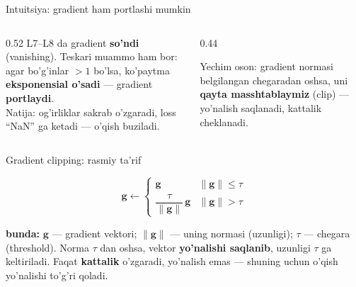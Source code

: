 \documentclass[aspectratio=169,11pt]{beamer}
\newcommand{\bunda}[1]{{\small\textbf{bunda:}\; #1}}
\begin{document}
\begin{frame}{Intuitsiya: gradient ham portlashi mumkin}
  \begin{columns}[T]
    \begin{column}{0.52\textwidth}
      \small
      L7--L8 da gradient \textbf{so'ndi} (vanishing). Teskari muammo ham bor:
      agar bo'g'inlar $>1$ bo'lsa, ko'paytma \textbf{eksponensial o'sadi} ---
      gradient \textbf{portlaydi}.\\[6pt]
      Natija: og'irliklar sakrab o'zgaradi, loss ``NaN'' ga ketadi --- o'qish buziladi.
    \end{column}
    \begin{column}{0.44\textwidth}
      \begin{tcolorbox}[okbox,top=2pt,bottom=2pt]
        \footnotesize
        Yechim oson: gradient normasi belgilangan chegaradan oshsa, uni
        \textbf{qayta masshtablaymiz} (clip) --- yo'nalish saqlanadi, kattalik
        cheklanadi.
      \end{tcolorbox}
    \end{column}
  \end{columns}
\end{frame}

\begin{frame}{Gradient clipping: rasmiy ta'rif}
  \begin{tcolorbox}[defbox,title=Ta'rif: norma bo'yicha gradient clipping]
    \vspace{-0.4em}
    $$ \mathbf{g} \leftarrow
       \begin{cases}
         \mathbf{g} & \|\mathbf{g}\| \le \tau\\[2pt]
         \dfrac{\tau}{\|\mathbf{g}\|}\,\mathbf{g} & \|\mathbf{g}\| > \tau
       \end{cases} $$
  \end{tcolorbox}
  \vspace{2pt}
  \bunda{$\mathbf{g}$ --- gradient vektori; $\|\mathbf{g}\|$ --- uning normasi
  (uzunligi); $\tau$ --- chegara (threshold). Norma $\tau$ dan oshsa, vektor
  \textbf{yo'nalishi saqlanib}, uzunligi $\tau$ ga keltiriladi.}
  \vspace{4pt}
  \footnotesize Faqat \textbf{kattalik} o'zgaradi, yo'nalish emas --- shuning uchun
  o'qish yo'nalishi to'g'ri qoladi.
\end{frame}
\end{document}
